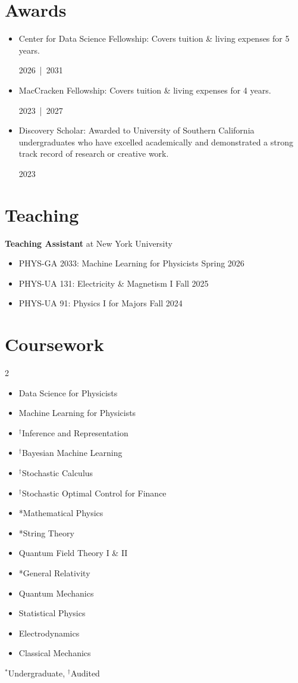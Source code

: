 \documentclass[a4paper,9pt]{extarticle}
\newcommand{\cvitem}[2]{%
  \item \parbox[t]{0.75\linewidth}{#1}\hfill\mbox{#2}%
}
\begin{document}
\newpage
\section*{Awards}
\begin{itemize}
  \cvitem{Center for Data Science Fellowship: Covers tuition \& living expenses for 5 years.}{2026 | 2031}
  \cvitem{MacCracken Fellowship: Covers tuition \& living expenses for 4 years.}{2023 | 2027}
  \cvitem{Discovery Scholar: Awarded to University of Southern California undergraduates who have excelled academically and demonstrated a strong track record of research or creative work.}{2023}
\end{itemize}

\section*{Teaching}
\textbf{Teaching Assistant} at New York University
\begin{itemize}
	\item PHYS-GA 2033: Machine Learning for Physicists \hfill Spring 2026
	\item PHYS-UA 131: Electricity \& Magnetism I \hfill Fall 2025
    \item PHYS-UA 91: Physics I for Majors \hfill Fall 2024
\end{itemize}

\section*{Coursework}
\vspace{-\multicolsep}
\begin{multicols}{2}
\begin{itemize}
    \item Data Science for Physicists
    \item Machine Learning for Physicists
    \item $^\dagger$Inference and Representation    
    \item $^\dagger$Bayesian Machine Learning
    \item $^\dagger$Stochastic Calculus
    \item $^\dagger$Stochastic Optimal Control for Finance
    \item *Mathematical Physics
    \item *String Theory
    \item Quantum Field Theory I \& II
    \item *General Relativity
    \item Quantum Mechanics
    \item Statistical Physics
    \item Electrodynamics
    \item Classical Mechanics
\end{itemize}
\end{multicols}
\noindent$^*$Undergraduate, $^\dagger$Audited
\end{document}
